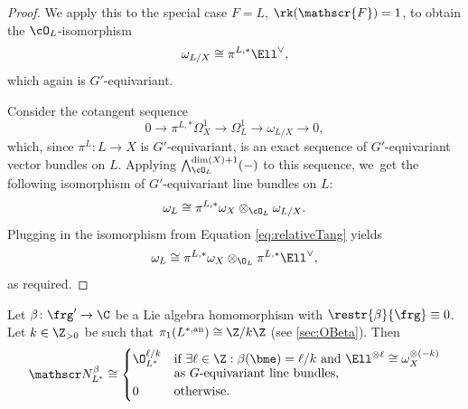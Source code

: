 \begin{proof}
We apply this to the special case $F=L$, \ie $\rk(\mathscr{F})=1$, to obtain the $\cO_L$\nobreakdash-isomorphism
\begin{equation}\label{eq:relativeTang}
\omega_{L/X}\cong \pi^{L,*}\Ell^\vee,
\end{equation}which again is $G'$-equivariant.

Consider the cotangent sequence
\[
0 \to \pi^{L,*} \Omega^1_X \to \Omega^1_L
\to \omega_{L/X}\to 0,
\]
which, since $\pi^L \colon L\to X$ is $G'$-equivariant, is an exact sequence of $G'$-equivariant vector bundles on $L$. Applying $\bigwedge^{\dim(X)+1}_{\cO_L}(-)$ to this sequence, we~get the following isomorphism of $G'$-equivariant line bundles on $L$:
\[
\omega_L \cong \pi^{L,*}\omega_X \otimes_{\cO_L} \omega_{L/X}.
\]
Plugging in the isomorphism from Equation \eqref{eq:relativeTang} yields
\[
\omega_L \cong \pi^{L,*} \omega_X \otimes_{\O_L} \pi^{L,*} \Ell^\vee,
\]
as required.
\end{proof}

\begin{prop} \label{prop:NBetaEqualsOBeta}
Let
$\beta \colon \frg' \to \C$ be a Lie algebra homomorphism with $\restr{\beta}{\frg} \equiv 0$. Let $k \in \Z_{>0}$ be such that $\pi_1(L^{*,\mathrm{an}}) \cong \Z/k\Z$ (see \cref{sec:OBeta}). Then
\[
\mathscr N_{L^*}^\beta \cong 
\begin{cases}
\O_{L^*}^{\ell/k} &\text{if $\exists \ell \in \Z: \beta(\bme) = \ell/k$ and $\Ell^{\otimes \ell} \cong \omega_X^{\otimes (-k)}$} \\[-3pt]
& \text{as $G$-equivariant line bundles,} \\
0 & \text{otherwise.}
\end{cases}
\]
\end{prop}

